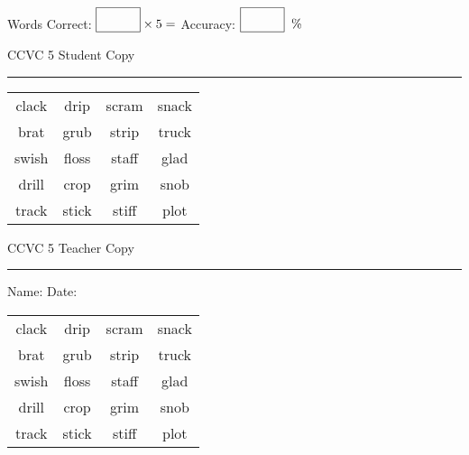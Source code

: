 \documentclass{memoir}
\begin{document}
\normalsize

Words Correct: $\fbox{\phantom{\huge 100}} \times 5 = $ Accuracy: $\fbox{\phantom{\huge 100}}\;\; \%$ 

\vfill

\newpage


\footnotesize \noindent
CCVC 5 \hfill Student Copy
\smallskip
\hrule

\Large

\setlength{\tabcolsep}{14pt}
\def\arraystretch{3}

{\selectfont


\begin{vplace}[0.5]
\begin{center}
\begin{tabular}{cccc}
clack             & drip & scram & snack \\
brat               & grub & strip & truck \\
swish & floss & staff            & glad \\
drill & crop & grim       & snob \\
track       & stick & stiff & plot \\
\end{tabular}
\end{center}
\end{vplace}

}

\newpage

\footnotesize \noindent
CCVC 5 \hfill Teacher Copy
\smallskip
\hrule

\normalsize

\vfill

\noindent
Name: \underline{\hspace{1.75in}} \hfill Date: \underline{\hspace{1in}}

\Large

{\selectfont


\begin{vplace}[0.5]
\begin{center}
\begin{tabular}{cccc}
clack             & drip & scram & snack \\
brat               & grub & strip & truck \\
swish & floss & staff            & glad \\
drill & crop & grim       & snob \\
track       & stick & stiff & plot \\
\end{tabular}
\end{center}
\end{vplace}



}
\end{document}
